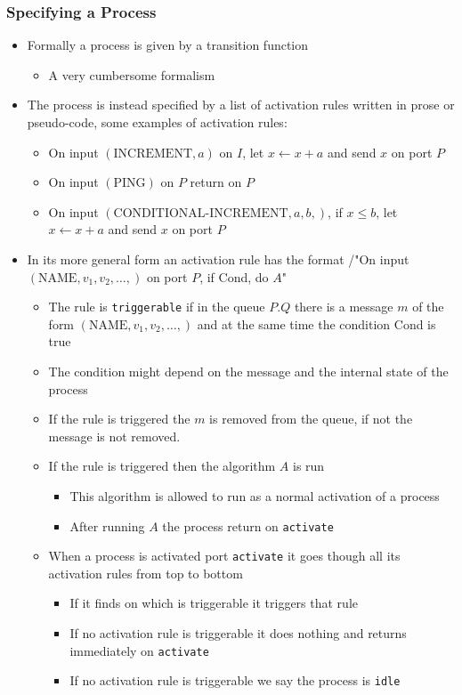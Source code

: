 \documentclass[11pt]{article}
\begin{document}
\subsubsection{Specifying a Process}
\label{sec:org34e11a1}
\begin{itemize}
\item Formally a process is given by a transition function
\begin{itemize}
\item A very cumbersome formalism
\end{itemize}

\item The process is instead specified by a list of activation rules written in prose or pseudo-code, some examples of activation rules:
\begin{itemize}
\item On input \((\text{INCREMENT},a)\) on \(I\), let \(x \leftarrow x+a\) and send \(x\) on port \(P\)
\item On input \((\text{PING})\) on \(P\) return on \(P\)
\item On input \((\text{CONDITIONAL-INCREMENT},a,b,)\), if \(x \leq b\), let \(x \leftarrow x+a\) and send \(x\) on port \(P\)
\end{itemize}

\item In its more general form an activation rule has the format /"On input \((\text{NAME}, v_1, v_2, \dots, )\) on port \(P\), if Cond, do \(A\)"
\begin{itemize}
\item The rule is \texttt{triggerable} if in the queue \(P.Q\) there is a message \(m\) of the form \((\text{NAME}, v_1, v_2, \dots, )\) and at the same time the condition Cond is true
\item The condition might depend on the message and the internal state of the process
\item If the rule is triggered the \(m\) is removed from the queue, if not the message is not removed.
\item If the rule is triggered then the algorithm \(A\) is run
\begin{itemize}
\item This algorithm is allowed to run as a normal activation of a process
\item After running \(A\) the process return on \texttt{activate}
\end{itemize}
\item When a process is activated port \texttt{activate} it goes though all its activation rules from top to bottom
\begin{itemize}
\item If it finds on which is triggerable it triggers that rule
\item If no activation rule is triggerable it does nothing and returns immediately on \texttt{activate}
\item If no activation rule is triggerable we say the process is \texttt{idle}
\end{itemize}
\end{itemize}
\end{itemize}
\end{document}
